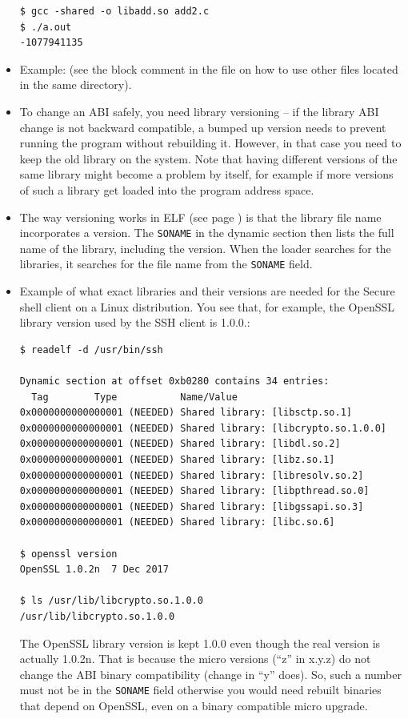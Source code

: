 \begin{itemize}
\begin{verbatim}
$ gcc -shared -o libadd.so add2.c
$ ./a.out
-1077941135
\end{verbatim}

\item {} Example:  (see the block
comment in the file on how to use other files located in the same directory).
\item To change an ABI safely, you need library versioning -- if the library
ABI change is not backward compatible, a bumped up version needs to prevent
running the program without rebuilding it.   However, in that case you need to keep
the old library on the system.  Note that having different versions of the same
library might become a problem by itself, for example if more versions of such
a library get loaded into the program address space.
\item The way versioning works in ELF (see page \pageref{ELF}) is that the
library file name incorporates a version.  The \texttt{SONAME} in the dynamic
section then lists the full name of the library, including the version.  When
the loader searches for the libraries, it searches for the file name from the
\texttt{SONAME} field.
\item Example of what exact libraries and their versions are needed for the
Secure shell client on a Linux distribution.  You see that, for example, the
OpenSSL library version used by the SSH client is 1.0.0.:

\begin{verbatim}
$ readelf -d /usr/bin/ssh

Dynamic section at offset 0xb0280 contains 34 entries:
  Tag        Type           Name/Value
0x0000000000000001 (NEEDED) Shared library: [libsctp.so.1]
0x0000000000000001 (NEEDED) Shared library: [libcrypto.so.1.0.0]
0x0000000000000001 (NEEDED) Shared library: [libdl.so.2]
0x0000000000000001 (NEEDED) Shared library: [libz.so.1]
0x0000000000000001 (NEEDED) Shared library: [libresolv.so.2]
0x0000000000000001 (NEEDED) Shared library: [libpthread.so.0]
0x0000000000000001 (NEEDED) Shared library: [libgssapi.so.3]
0x0000000000000001 (NEEDED) Shared library: [libc.so.6]

$ openssl version
OpenSSL 1.0.2n  7 Dec 2017

$ ls /usr/lib/libcrypto.so.1.0.0
/usr/lib/libcrypto.so.1.0.0
\end{verbatim}

\par The OpenSSL library version is kept 1.0.0 even though the real version is
actually 1.0.2n.  That is because the micro versions (``z'' in x.y.z) do not
change the ABI binary compatibility (change in ``y'' does).  So, such a number
must not be in the \texttt{SONAME} field otherwise you would need rebuilt
binaries that depend on OpenSSL, even on a binary compatible micro upgrade.
\end{itemize}

